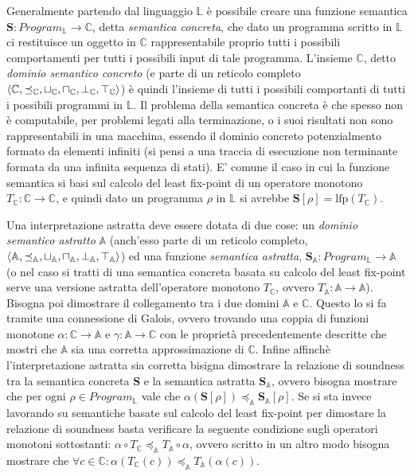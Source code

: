Generalmente partendo dal linguaggio \(\mathbb{L}\) è possibile creare una funzione semantica \(\textbf{S}:Program_\mathbb{L}\rightarrow \mathbb{C}\), detta \textit{semantica concreta}, che dato un programma scritto in \(\mathbb{L}\) ci restituisce un oggetto in \(\mathbb{C}\) rappresentabile proprio tutti i possibili comportamenti per tutti i possibili input di tale programma. L'insieme \(\mathbb{C}\), detto \textit{dominio semantico concreto} (e parte di un reticolo completo \(\langle \mathbb{C}, \preceq_{\mathbb{C}},\sqcup_{\mathbb{C}}, \sqcap_{\mathbb{C}}, \perp_{\mathbb{C}}, \top_{\mathbb{C}}\rangle\)) è quindi l'insieme di tutti i possibili comportanti di tutti i possibili programmi in \(\mathbb{L}\). Il problema della semantica concreta è che spesso non è computabile, per problemi legati alla terminazione, o i suoi risultati non sono rappresentabili in una macchina, essendo il dominio concreto potenzialmento formato da elementi infiniti (si pensi a una traccia di esecuzione non terminante formata da una infinita sequenza di stati). E' comune il caso in cui la funzione semantica si basi sul calcolo del least fix-point di un operatore monotono \(T_{\mathbb{C}}:\mathbb{C}\rightarrow \mathbb{C}\), e quindi dato un programma \(\rho\) in \(\mathbb{L}\) si avrebbe \(\textbf{S}[\rho]=\textrm{lfp}(T_{\mathbb{C}})\).

Una interpretazione astratta deve essere dotata di due cose: un \textit{dominio semantico astratto} \(\mathbb{A}\) (anch'esso parte di un reticolo completo, \(\langle \mathbb{A}, \preceq_{\mathbb{A}},\sqcup_{\mathbb{A}}, \sqcap_{\mathbb{A}}, \perp_{\mathbb{A}}, \top_{\mathbb{A}}\rangle\)) ed una funzione \textit{semantica astratta}, \(\textbf{S}_{\mathbb{A}}:Program_\mathbb{L}\rightarrow \mathbb{A}\) (o nel caso si tratti di una semantica concreta basata su calcolo del least fix-point serve una versione astratta dell'operatore monotono \(T_{\mathbb{C}}\), ovvero \(T_{\mathbb{A}}:\mathbb{A}\rightarrow \mathbb{A}\)).
Bisogna poi dimostrare il collegamento tra i due domini \(\mathbb{A}\) e \(\mathbb{C}\). Questo lo si fa tramite una connessione di Galois, ovvero trovando una coppia di funzioni monotone \(\alpha:\mathbb{C}\rightarrow \mathbb{A}\) e \(\gamma:\mathbb{A}\rightarrow \mathbb{C}\) con le proprietà precedentemente descritte che mostri che \(\mathbb{A}\) sia una corretta approssimazione di \(\mathbb{C}\). Infine affinchè l'interpretazione astratta sia corretta bisigna dimostrare la relazione di soundness tra la semantica concreta \(\textbf{S}\) e la semantica astratta \(\textbf{S}_{\mathbb{A}}\), ovvero bisogna mostrare che per ogni \(\rho\in Program_{\mathbb{L}}\) vale che \(\alpha(\textbf{S}[\rho])\preceq_{\mathbb{A}}\textbf{S}_{\mathbb{A}}[\rho]\). Se si sta invece lavorando su semantiche basate sul calcolo del least fix-point per dimostare la relazione di soundness basta verificare la seguente condizione sugli operatori monotoni sottostanti: \(\alpha\circ T_{\mathbb{C}}\preceq_{\mathbb{A}} T_{\mathbb{A}}\circ\alpha\), ovvero scritto in un altro modo bisogna mostrare che \(\forall c\in\mathbb{C}:\alpha(T_{\mathbb{C}}(c))\preceq_{\mathbb{A}}T_{\mathbb{A}}(\alpha(c))\).



